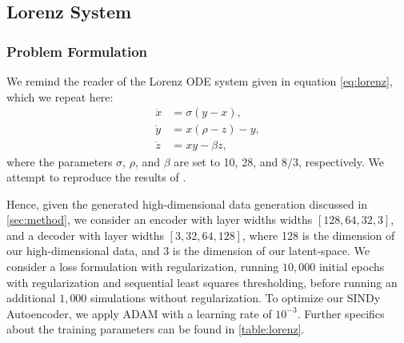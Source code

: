 \subsection{Lorenz System}
\subsubsection{Problem Formulation}
We remind the reader of the Lorenz ODE system given in equation \ref{eq:lorenz}, which we repeat here:
\begin{equation*}
\begin{aligned}
    \dot{x} &= \sigma (y - x), \\
    \dot{y} &= x (\rho - z) - y, \\
    \dot{z} &= x y - \beta z,
\end{aligned}
\end{equation*}
where the parameters $\sigma$, $\rho$, and $\beta$ are set to 10, 28, and $8/3$, respectively. 
We attempt to reproduce the results of \textcite{Champion_2019}.

Hence, given the generated high-dimensional data generation discussed in \ref{sec:method}, we consider an encoder with layer widths widths $[128, 64, 32, 3]$, and a decoder with layer widths $[3, 32, 64, 128]$, where 128 is the dimension of our high-dimensional data, and 3 is the dimension of our latent-space. 
We consider a loss formulation with regularization, running $10,000$ initial epochs with regularization and sequential least squares thresholding, before running an additional $1,000$ simulations without regularization. 
To optimize our SINDy Autoencoder, we apply \textsc{ADAM} with a learning rate of $10^{-3}$. 
Further specifics about the training parameters can be found in \autoref{table:lorenz}. 

